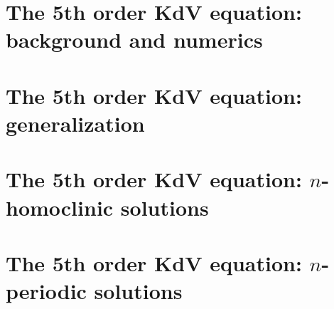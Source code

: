 \documentclass[11pt,reqno,oneside]{amsbook}
\theoremstyle{plain}
\theoremstyle{definition}
\theoremstyle{remark}
\numberwithin{section}{chapter}
\numberwithin{equation}{chapter}
\newif\iffulldocument
\begin{document}
\fulldocumenttrue

\mainmatter

\chapter{The 5th order KdV equation: background and numerics}\label{chapter:KdV5}



\chapter{The 5th order KdV equation: generalization}\label{chapter:kdv5general}



\chapter{The 5th order KdV equation: $n$-homoclinic solutions}\label{chapter:kdv5homoclinic}


\chapter{The 5th order KdV equation: $n$-periodic solutions }\label{chapter:kdv5periodic}






% 

\backmatter



\end{document}
